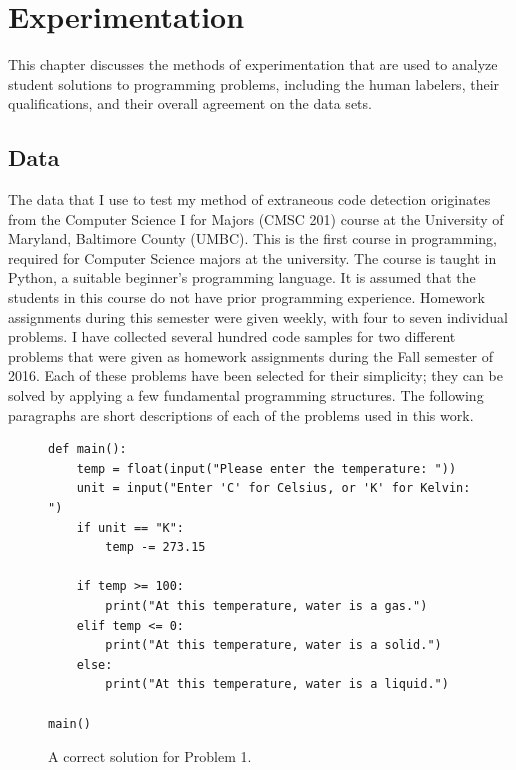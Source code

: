 \renewcommand{\thechapter}{5}
\chapter{Experimentation}
This chapter discusses the methods of experimentation that are used to analyze student solutions to programming problems, including the human labelers, their qualifications, and their overall agreement on the data sets.

\section{Data}
The data that I use to test my method of extraneous code detection originates from the Computer Science I for Majors (CMSC 201) course at the University of Maryland, Baltimore County (UMBC). This is the first course in programming, required for Computer Science majors at the university. The course is taught in Python, a suitable beginner's programming language. It is assumed that the students in this course do not have prior programming experience. Homework assignments during this semester were given weekly, with four to seven individual problems. I have collected several hundred code samples for two different problems that were given as homework assignments during the Fall semester of 2016. Each of these problems have been selected for their simplicity; they can be solved by applying a few fundamental programming structures. The following paragraphs are short descriptions of each of the problems used in this work.

\begin{figure}[ht]
\begin{lstlisting}[numbers=none]
def main():
    temp = float(input("Please enter the temperature: "))
    unit = input("Enter 'C' for Celsius, or 'K' for Kelvin: ")
    if unit == "K":
        temp -= 273.15
    
    if temp >= 100:
        print("At this temperature, water is a gas.")
    elif temp <= 0:
        print("At this temperature, water is a solid.")
    else:
        print("At this temperature, water is a liquid.")

main()
\end{lstlisting}
\caption{A correct solution for Problem 1.}
\label{fig:correctp1}
\end{figure}
